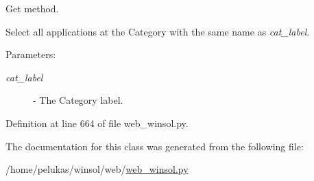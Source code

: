 Get method. 

Select all applications at the Category with the same name as {\em cat\_\-label\/}.

\begin{Desc}
\item[Parameters:]
\begin{description}
\item[{\em cat\_\-label}]- The Category label. \end{description}
\end{Desc}


Definition at line 664 of file web\_\-winsol.py.

The documentation for this class was generated from the following file:\begin{CompactItemize}
\item 
/home/pelukas/winsol/web/\hyperlink{web__winsol_8py}{web\_\-winsol.py}\end{CompactItemize}
